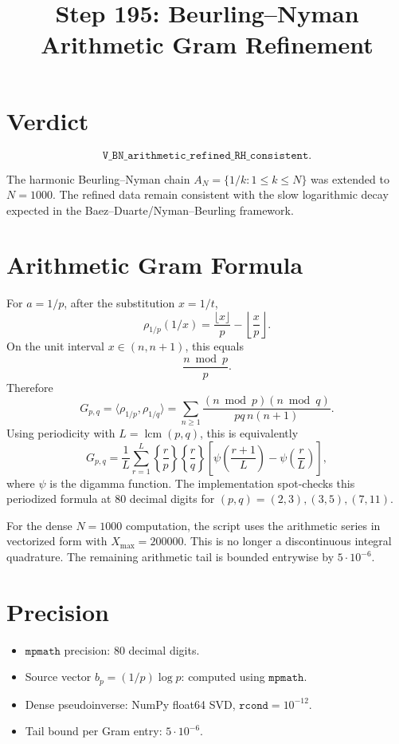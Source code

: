 \documentclass[11pt]{article}
\title{Step 195: Beurling--Nyman Arithmetic Gram Refinement}
\date{}
\begin{document}
\maketitle

\section*{Verdict}

\[
\boxed{\texttt{V\_BN\_arithmetic\_refined\_RH\_consistent}}.
\]

The harmonic Beurling--Nyman chain \(A_N=\{1/k:1\le k\le N\}\) was extended to \(N=1000\).  The refined data remain consistent with the slow logarithmic decay expected in the Baez--Duarte/Nyman--Beurling framework.

\section*{Arithmetic Gram Formula}

For \(a=1/p\), after the substitution \(x=1/t\),
\[
\rho_{1/p}(1/x)
=
\frac{\lfloor x\rfloor}{p}-\left\lfloor \frac{x}{p}\right\rfloor.
\]
On the unit interval \(x\in(n,n+1)\), this equals
\[
\frac{n\bmod p}{p}.
\]
Therefore
\[
G_{p,q}
=
\langle \rho_{1/p},\rho_{1/q}\rangle
=
\sum_{n\ge1}
\frac{(n\bmod p)(n\bmod q)}{pq\,n(n+1)}.
\]
Using periodicity with \(L=\operatorname{lcm}(p,q)\), this is equivalently
\[
G_{p,q}
=
\frac1L\sum_{r=1}^L
\left\{\frac rp\right\}\left\{\frac rq\right\}
\left[
\psi\!\left(\frac{r+1}{L}\right)
-
\psi\!\left(\frac rL\right)
\right],
\]
where \(\psi\) is the digamma function.  The implementation spot-checks this periodized formula at 80 decimal digits for \((p,q)=(2,3),(3,5),(7,11)\).

For the dense \(N=1000\) computation, the script uses the arithmetic series in vectorized form with \(X_{\max}=200000\).  This is no longer a discontinuous integral quadrature.  The remaining arithmetic tail is bounded entrywise by \(5\cdot 10^{-6}\).

\section*{Precision}

\begin{itemize}
\item \(\texttt{mpmath}\) precision: 80 decimal digits.
\item Source vector \(b_p=(1/p)\log p\): computed using \(\texttt{mpmath}\).
\item Dense pseudoinverse: NumPy float64 SVD, \(\texttt{rcond}=10^{-12}\).
\item Tail bound per Gram entry: \(5\cdot10^{-6}\).
\end{itemize}
\end{document}
